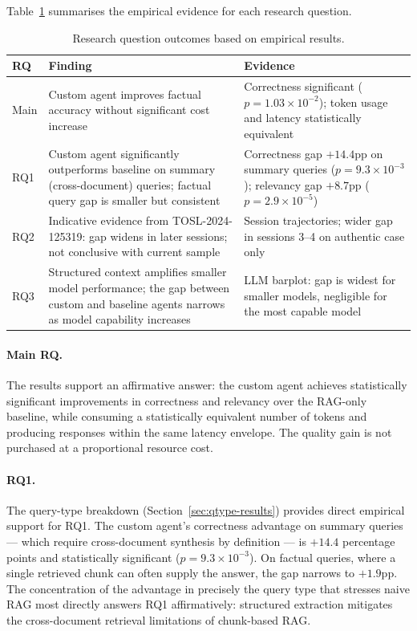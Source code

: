 Table~\ref{tab:rq-summary} summarises the empirical evidence for each research question.

\begin{table}[H]
\centering
\caption{Research question outcomes based on empirical results.}
\label{tab:rq-summary}
\begin{tabular}{p{} p{} p{}}
\hline
\textbf{RQ} & \textbf{Finding} & \textbf{Evidence} \\
\hline
Main & Custom agent improves factual accuracy without significant cost increase &
  Correctness significant ($p{=}1.03{\times}10^{-2}$); token usage and latency
  statistically equivalent \\[6pt]
RQ1 & Custom agent significantly outperforms baseline on summary (cross-document) queries;
  factual query gap is smaller but consistent &
  Correctness gap $+14.4$pp on summary queries ($p{=}9.3{\times}10^{-3}$);
  relevancy gap $+8.7$pp ($p{=}2.9{\times}10^{-5}$) \\[6pt]
RQ2 & Indicative evidence from TOSL-2024-125319: gap widens in later sessions; not
  conclusive with current sample &
  Session trajectories; wider gap in sessions 3--4 on authentic case only \\[6pt]
RQ3 & Structured context amplifies smaller model performance; the gap between custom
  and baseline agents narrows as model capability increases &
  LLM barplot: gap is widest for smaller models, negligible for the most capable model \\
\hline
\end{tabular}
\end{table}

\paragraph{Main RQ.}
The results support an affirmative answer: the custom agent achieves statistically
significant improvements in correctness and relevancy over the RAG-only baseline, while
consuming a statistically equivalent number of tokens and producing responses within the
same latency envelope. The quality gain is not purchased at a proportional resource cost.

\paragraph{RQ1.}
The query-type breakdown (Section~\ref{sec:qtype-results}) provides direct empirical
support for RQ1. The custom agent's correctness advantage on summary queries ---
which require cross-document synthesis by definition --- is $+14.4$ percentage points
and statistically significant ($p = 9.3 \times 10^{-3}$). On factual queries, where
a single retrieved chunk can often supply the answer, the gap narrows to $+1.9$pp.
The concentration of the advantage in precisely the query type that stresses naive
RAG most directly answers RQ1 affirmatively: structured extraction mitigates the
cross-document retrieval limitations of chunk-based RAG.

